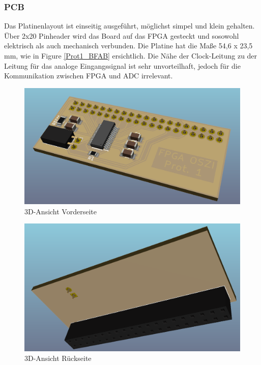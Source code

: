 \subsubsection{PCB}
Das Platinenlayout ist einseitig ausgeführt, möglichst simpel und klein gehalten. Über 2x20 Pinheader wird das Board auf das FPGA gesteckt und sosowohl elektrisch als auch mechanisch verbunden. Die Platine hat die Maße 54,6 x 23,5 mm, wie in Figure \ref{Prot1_BFAB} ersichtlich. Die Nähe der Clock-Leitung zu der Leitung für das analoge Eingangssignal ist sehr unvorteilhaft, jedoch für die Kommunikation zwischen FPGA und ADC irrelevant.
\begin{figure}[H]
\begin{center}
\includegraphics[width = 15cm]{SAUER/Grafiken/Prot1/3DF.png}
\caption{3D-Ansicht Vorderseite}
\end{center}
\end{figure}
\begin{figure}[H]
\begin{center}
\includegraphics[width = 15cm]{SAUER/Grafiken/Prot1/3DB.png}
\caption{3D-Ansicht Rückseite}
\end{center}
\end{figure}
